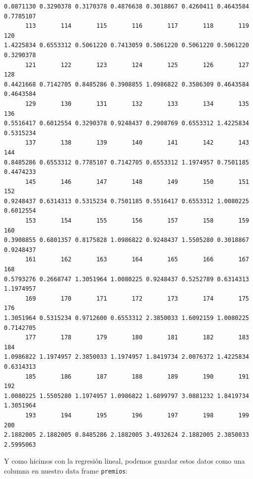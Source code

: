 \documentclass[
  letterpaper,
  DIV=11,
  numbers=noendperiod]{scrreprt}
\newenvironment{Shaded}{\begin{snugshade}}{\end{snugshade}}
\newcommand{\AttributeTok}[1]{\textcolor[rgb]{0.40,0.45,0.13}{#1}}
\newcommand{\FunctionTok}[1]{\textcolor[rgb]{0.28,0.35,0.67}{#1}}
\newcommand{\NormalTok}[1]{\textcolor[rgb]{0.00,0.23,0.31}{#1}}
\newcommand{\OtherTok}[1]{\textcolor[rgb]{0.00,0.23,0.31}{#1}}
\newcommand{\SpecialCharTok}[1]{\textcolor[rgb]{0.37,0.37,0.37}{#1}}
\newcommand{\StringTok}[1]{\textcolor[rgb]{0.13,0.47,0.30}{#1}}
\begin{document}
\begin{verbatim}
0.0871130 0.3290378 0.3170378 0.4876638 0.3018867 0.4260411 0.4643584 0.7785107 
      113       114       115       116       117       118       119       120 
1.4225834 0.6553312 0.5061220 0.7413059 0.5061220 0.5061220 0.5061220 0.3290378 
      121       122       123       124       125       126       127       128 
0.4421668 0.7142705 0.8485286 0.3908855 1.0986822 0.3586309 0.4643584 0.4643584 
      129       130       131       132       133       134       135       136 
0.5516417 0.6012554 0.3290378 0.9248437 0.2908769 0.6553312 1.4225834 0.5315234 
      137       138       139       140       141       142       143       144 
0.8485286 0.6553312 0.7785107 0.7142705 0.6553312 1.1974957 0.7501185 0.4474233 
      145       146       147       148       149       150       151       152 
0.9248437 0.6314313 0.5315234 0.7501185 0.5516417 0.6553312 1.0080225 0.6012554 
      153       154       155       156       157       158       159       160 
0.3908855 0.6801357 0.8175828 1.0986822 0.9248437 1.5505280 0.3018867 0.9248437 
      161       162       163       164       165       166       167       168 
0.5793276 0.2668747 1.3051964 1.0080225 0.9248437 0.5252789 0.6314313 1.1974957 
      169       170       171       172       173       174       175       176 
1.3051964 0.5315234 0.9712600 0.6553312 2.3850033 1.6092159 1.0080225 0.7142705 
      177       178       179       180       181       182       183       184 
1.0986822 1.1974957 2.3850033 1.1974957 1.8419734 2.0076372 1.4225834 0.6314313 
      185       186       187       188       189       190       191       192 
1.0080225 1.5505280 1.1974957 1.0986822 1.6899797 3.0881232 1.8419734 1.3051964 
      193       194       195       196       197       198       199       200 
2.1882005 2.1882005 0.8485286 2.1882005 3.4932624 2.1882005 2.3850033 2.5995063 
\end{verbatim}

Y como hicimos con la regresión lineal, podemos guardar estos datos como
una columna en nuestro data frame \texttt{premios}:

\begin{Shaded}
\end{Shaded}
\end{document}
